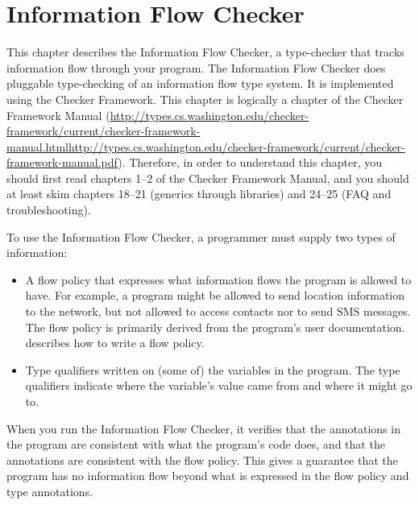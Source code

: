 \htmlhr

\newcommand{\theFlowChecker}{the Information Flow Checker\xspace}
\newcommand{\TheFlowChecker}{The Information Flow Checker\xspace}

\chapter{Information Flow Checker\label{flow-checker}}
This chapter describes the Information Flow Checker, a type-checker that 
tracks information flow through your program.
The Information Flow Checker does pluggable type-checking of an information flow type
system.  It is implemented using the Checker Framework.  This chapter is
logically a chapter of the 
Checker Framework Manual (\ifhevea\url{http://types.cs.washington.edu/checker-framework/current/checker-framework-manual.html}\else\url{http://types.cs.washington.edu/checker-framework/current/checker-framework-manual.pdf}\fi).
Therefore, in order to understand this chapter, you should first read
chapters 1--2 of the Checker Framework Manual, and you should at least skim
chapters 18--21 (generics through libraries) and 24--25 (FAQ and
troubleshooting). 



To use the Information Flow Checker, a programmer must supply two types of
information:

\begin{itemize}
\item
A flow policy that expresses what information flows the program is allowed
to have.   For example, a program might be allowed to send location
information to the network, but not allowed to access contacts nor to send
SMS messages.  The flow policy is primarily derived from the program's user
documentation.   describes how to write a flow
policy.
\item
{}
Type qualifiers written on (some of) the variables in the program.  The
type qualifiers indicate where the variable's value came from and where it
might go to.
\end{itemize}

When you run the Information Flow Checker, it verifies that the annotations in the
program are consistent with what the program's code does, and that the
annotations are consistent with the flow policy.  This gives a guarantee
that the program has no information flow beyond what is expressed in the
flow policy and type annotations.


